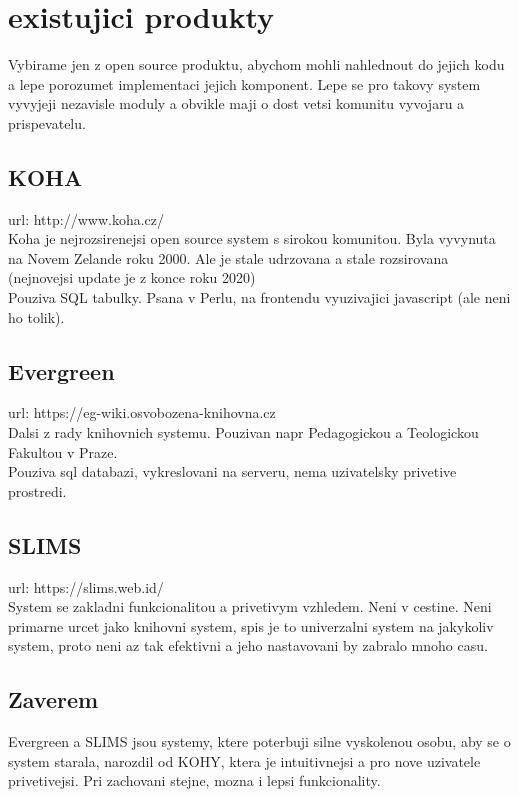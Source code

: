 \chapter{existujici produkty}
Vybirame jen z open source produktu, abychom mohli nahlednout
do jejich kodu a lepe porozumet implementaci jejich komponent.
Lepe se pro takovy system vyvyjeji nezavisle moduly a
obvikle maji o dost vetsi komunitu vyvojaru a prispevatelu.


\section{KOHA}
url: http://www.koha.cz/\\
Koha je nejrozsirenejsi open source system s sirokou komunitou.
Byla vyvynuta na Novem Zelande roku 2000.
Ale je stale udrzovana a stale rozsirovana
(nejnovejsi update je z konce roku 2020)
\\
Pouziva SQL tabulky.
Psana v Perlu, na frontendu vyuzivajici javascript (ale neni ho tolik).


\section{Evergreen}
url: https://eg-wiki.osvobozena-knihovna.cz\\
Dalsi z rady knihovnich systemu.
Pouzivan napr Pedagogickou a Teologickou Fakultou v Praze.\\
Pouziva sql databazi, vykreslovani na serveru, nema uzivatelsky privetive prostredi.



\section{SLIMS}
url: https://slims.web.id/\\
System se zakladni funkcionalitou a privetivym vzhledem.
Neni v cestine. Neni primarne urcet jako knihovni system, spis je to univerzalni
system na jakykoliv system, proto neni az tak efektivni a jeho nastavovani
by zabralo mnoho casu.

\section{Zaverem}
Evergreen a SLIMS jsou systemy, ktere poterbuji silne vyskolenou osobu,
aby se o system starala, narozdil od KOHY, ktera je intuitivnejsi a
pro nove uzivatele privetivejsi. Pri zachovani stejne, mozna i lepsi funkcionality.\\
\\

